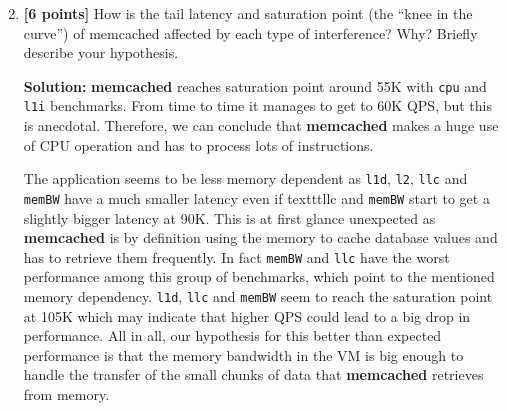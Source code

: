 

\begin{enumerate}[label=(\alph*)]
    \setcounter{enumi}{1}
    
    \item \textbf{[6 points]} How is the tail latency and saturation point (the “knee in the curve”) of memcached affected by each type of interference? Why? Briefly describe your hypothesis.
    
    \textbf{Solution:} \textbf{memcached} reaches saturation point around 55K with \texttt{cpu} and \texttt{l1i} benchmarks. From time to time it manages to get to 60K QPS, but this is anecdotal. Therefore, we can conclude that \textbf{memcached} makes a huge use of CPU operation and has to process lots of instructions.
    
    The application seems to be less memory dependent as \texttt{l1d},  \texttt{l2}, \texttt{llc} and \texttt{memBW} have a much smaller latency even if texttt{llc} and \texttt{memBW} start to get a slightly bigger latency at 90K. This is at first glance unexpected as \textbf{memcached} is by definition using the memory to cache database values and has to retrieve them frequently. In fact \texttt{memBW} and \texttt{llc} have the worst performance among this group of benchmarks, which point to the mentioned memory dependency. \texttt{l1d}, \texttt{llc} and \texttt{memBW} seem to reach the saturation point at 105K which may indicate that higher QPS could lead to a big drop in performance. All in all, our hypothesis for this better than expected performance is that the memory bandwidth in the VM is big enough to handle the transfer of the small chunks of data that \textbf{memcached} retrieves from memory. 
    
\end{enumerate}


